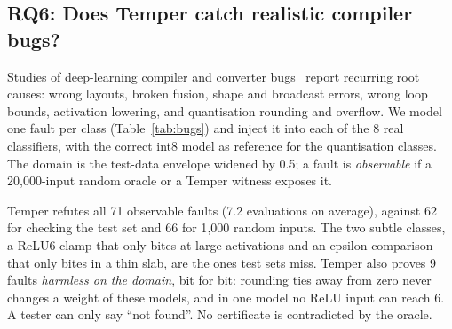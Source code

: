 \documentclass[conference]{IEEEtran}
\begin{document}
\subsection{RQ6: Does Temper catch realistic compiler bugs?}
Studies of deep-learning compiler and converter bugs~\cite{dlcbugs} report recurring root causes: wrong layouts, broken fusion, shape and broadcast errors, wrong loop bounds, activation lowering, and quantisation rounding and overflow. We model one fault per class (Table~\ref{tab:bugs}) and inject it into each of the 8 real classifiers, with the correct int8 model as reference for the quantisation classes. The domain is the test-data envelope widened by 0.5; a fault is \emph{observable} if a 20{,}000-input random oracle or a Temper witness exposes it.
\begin{table}[t]\centering\caption{Bug classes on 8 real models (number of models).}\label{tab:bugs}
\end{table}
Temper refutes all 71 observable faults (7.2 evaluations on average), against 62 for checking the test set and 66 for 1{,}000 random inputs. The two subtle classes, a ReLU6 clamp that only bites at large activations and an epsilon comparison that only bites in a thin slab, are the ones test sets miss. Temper also proves 9 faults \emph{harmless on the domain}, bit for bit: rounding ties away from zero never changes a weight of these models, and in one model no ReLU input can reach 6. A tester can only say ``not found''. No certificate is contradicted by the oracle.
\end{document}
